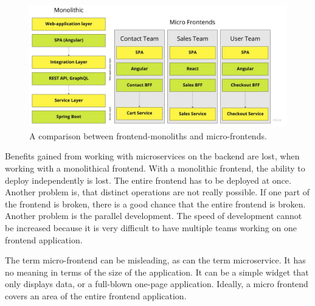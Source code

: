 \ifshowImages
\begin{figure}[H]
\centering
\includegraphics[width=0.8\linewidth]{images/ui-monotlith-micro-frontends.jpg}
\caption{A comparison between frontend-monoliths and micro-frontends.}\label{figure:state-of-the-art:ui-monotlith-micro-frontend}
\end{figure}
\fi


Benefits gained from working with microservices on the backend are lost, when working with a monolithical frontend. With a monolithic frontend, the ability to deploy independently is lost. The entire frontend has to be deployed at once. Another problem is, that distinct operations are not really possible. If one part of the frontend is broken, there is a good chance that the entire frontend is broken. Another problem is the parallel development. The speed of development cannot be increased because it is very difficult to have multiple teams working on one frontend application. \cite{misc:2019:leitner:micro-frontends}

The term micro-frontend can be misleading, as can the term microservice. It has no meaning in terms of the size of the application. It can be a simple widget that only displays data, or a full-blown one-page application. Ideally, a micro frontend covers an area of the entire frontend application.

\ifshowUnusedContent




